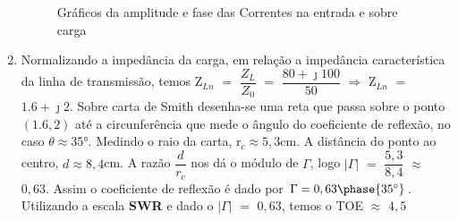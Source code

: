 \begin{enumerate}[1.]
%
\begin{figure}[!htb]
\centering
{}
\caption{Gráficos da amplitude e fase das Correntes na entrada e sobre carga}
\label{fig:IQ1}
\end{figure}
%
\newpage
%
\item Normalizando a impedância da carga, em relação a impedância característica da linha de transmissão, temos Z$_{Ln}$ $=$ $\dfrac{Z_{L}}{Z_{0}}$ $=$ $\dfrac{80 + \jmath 100}{50}$ $\Rightarrow$ Z$_{Ln}$ $=$ $1.6 + \jmath 2$. Sobre carta de Smith desenha-se uma reta que passa sobre o ponto $(1.6,2)$ até a circunferência que mede o ângulo do coeficiente de reflexão, no caso $\theta \approx 35$\si{\degree}. Medindo o raio da carta, r$_{c} \approx 5,3$\si{\centi\meter}. A distância do ponto ao centro, $d \approx 8,4$\si{\centi\meter}. A razão $\dfrac{d}{r_{c}}$ nos dá o módulo de $\Gamma$, logo $|\Gamma|$ $=$ $\dfrac{5,3}{8,4}$ $\approx$ $0,63$. Assim o coeficiente de reflexão é dado por $\Gamma = 0,63\phase{35^{\circ}}$. Utilizando a escala {\bf SWR} e dado o $|\Gamma|$ $=$ $0,63$, temos o TOE $\approx$ $4,5$


\end{enumerate}
